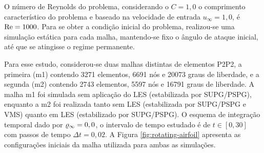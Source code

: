 O número de Reynolds do problema, considerando o $C=1,0$ o comprimento característico do problema e baseado na velocidade de entrada $u_\infty=1,0$, é $\mathrm{Re}=1000$. Para se obter a condição inicial do problema, realizou-se uma simulação estática para cada malha, mantendo-se fixo o ângulo de ataque inicial, até que se atingisse o regime permanente.

Para esse estudo, considerou-se duas malhas distintas de elementos P2P2, a primeira (m1) contendo 3271 elementos, 6691 nós e 20073 graus de liberdade, e a segunda (m2) contendo 2743 elementos, 5597 nós e 16791 graus de liberdade. A malha m1 foi simulada sem aplicação do LES (estabilizada por SUPG/PSPG), enquanto a m2 foi realizada tanto sem LES (estabilizada por SUPG/PSPG e VMS) quanto em LES (estabilizado por SUPG/PSPG). O esquema de integração temporal dado por $\varrho_\infty=0,0$, o intervalo de tempo estudado é de $t\in[0,30]$ com passos de tempo $\Delta t=0,02$. A Figura \ref{fig:rotating-airfoil} apresenta as configurações iniciais da malha utilizada para ambas as simulações.

